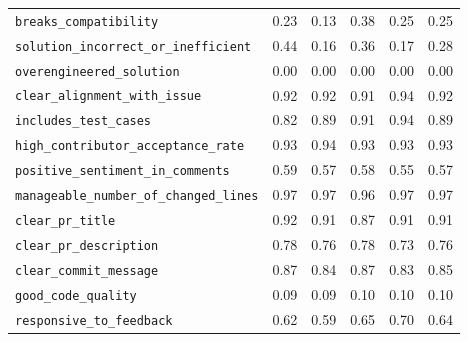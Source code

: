 \begin{table}[!htbp]
\begin{tabular}{lccccc}
\texttt{breaks\_compatibility} & 0.23 & 0.13 & 0.38 & 0.25 & 0.25 \\
\texttt{solution\_incorrect\_or\_inefficient} & 0.44 & 0.16 & 0.36 & 0.17 & 0.28 \\
\texttt{overengineered\_solution} & 0.00 & 0.00 & 0.00 & 0.00 & 0.00 \\
\texttt{clear\_alignment\_with\_issue} & 0.92 & 0.92 & 0.91 & 0.94 & 0.92 \\
\texttt{includes\_test\_cases} & 0.82 & 0.89 & 0.91 & 0.94 & 0.89 \\
\texttt{high\_contributor\_acceptance\_rate} & 0.93 & 0.94 & 0.93 & 0.93 & 0.93 \\
\texttt{positive\_sentiment\_in\_comments} & 0.59 & 0.57 & 0.58 & 0.55 & 0.57 \\
\texttt{manageable\_number\_of\_changed\_lines} & 0.97 & 0.97 & 0.96 & 0.97 & 0.97 \\
\texttt{clear\_pr\_title} & 0.92 & 0.91 & 0.87 & 0.91 & 0.91 \\
\texttt{clear\_pr\_description} & 0.78 & 0.76 & 0.78 & 0.73 & 0.76 \\
\texttt{clear\_commit\_message} & 0.87 & 0.84 & 0.87 & 0.83 & 0.85 \\
\texttt{good\_code\_quality} & 0.09 & 0.09 & 0.10 & 0.10 & 0.10 \\
\texttt{responsive\_to\_feedback} & 0.62 & 0.59 & 0.65 & 0.70 & 0.64 \\
\bottomrule
\end{tabular}
\end{table}


